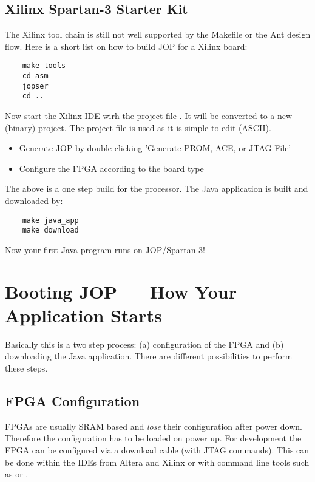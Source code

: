 \subsection{Xilinx Spartan-3 Starter Kit}

 The Xilinx tool chain is still not well supported by
the Makefile or the Ant design flow. Here is a short list on how to
build JOP for a Xilinx board:

\begin{verbatim}
    make tools
    cd asm
    jopser
    cd ..
\end{verbatim}


Now start the Xilinx IDE wirh the project file . It
will be converted to a new (binary)  project. The
 project file is used as it is simple to edit (ASCII).

\begin{itemize}
    \item Generate JOP by double clicking 'Generate PROM, ACE, or JTAG File'
    \item Configure the FPGA according to the board type
\end{itemize}

The above is a one step build for the processor. The Java
application is built and downloaded by:

\begin{verbatim}
    make java_app
    make download
\end{verbatim}

Now your first Java program runs on JOP/Spartan-3!

\section{Booting JOP --- How Your Application Starts}

Basically this is a two step process: (a) configuration of the FPGA
and (b) downloading the Java application. There are different
possibilities to perform these steps.

\subsection{FPGA Configuration}

FPGAs are usually SRAM based and \emph{lose} their configuration
after power down. Therefore the configuration has to be loaded on
power up. For development the FPGA can be configured via a download
cable (with JTAG commands). This can be done within the IDEs from
Altera and Xilinx or with command line tools such as
 or .

